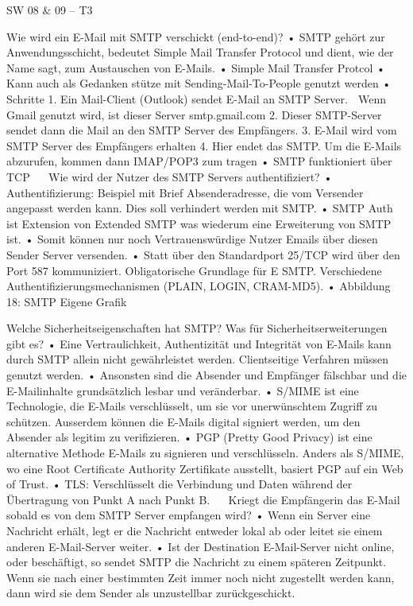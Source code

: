 \begin{itemize}
SW 08 & 09 – T3

Wie wird ein E-Mail mit SMTP verschickt (end-to-end)?
•	SMTP gehört zur Anwendungsschicht, bedeutet Simple Mail Transfer Protocol und dient, wie der Name sagt, zum Austauschen von E-Mails. 
•	Simple Mail Transfer Protcol
•	Kann auch als Gedanken stütze mit Sending-Mail-To-People genutzt werden
•	Schritte
1.	Ein Mail-Client (Outlook) sendet E-Mail an SMTP Server.
	Wenn Gmail genutzt wird, ist dieser Server smtp.gmail.com
2.	Dieser SMTP-Server sendet dann die Mail an den SMTP Server des Empfängers. 
3.	E-Mail wird vom SMTP Server des Empfängers erhalten
4.	Hier endet das SMTP. Um die E-Mails abzurufen, kommen dann IMAP/POP3 zum tragen 
•	SMTP funktioniert über TCP
 
Wie wird der Nutzer des SMTP Servers authentifiziert?
•	Authentifizierung: Beispiel mit Brief Absenderadresse, die vom Versender angepasst werden kann. Dies soll verhindert werden mit SMTP. 
•	SMTP Auth ist Extension von Extended SMTP was wiederum eine Erweiterung von SMTP ist.
•	Somit können nur noch Vertrauenswürdige Nutzer Emails über diesen Sender Server versenden. 
•	Statt über den Standardport 25/TCP wird über den Port 587 kommuniziert. Obligatorische Grundlage für E SMTP. Verschiedene Authentifizierungsmechanismen (PLAIN, LOGIN, CRAM-MD5).
•	 
Abbildung 18: SMTP Eigene Grafik


Welche Sicherheitseigenschaften hat SMTP? Was für Sicherheitserweiterungen gibt es?
•	Eine Vertraulichkeit, Authentizität und Integrität von E-Mails kann durch SMTP allein nicht gewährleistet werden. Clientseitige Verfahren müssen genutzt werden. 
•	Ansonsten sind die Absender und Empfänger fälschbar und die E-Mailinhalte grundsätzlich lesbar und veränderbar. 
•	S/MIME ist eine Technologie, die E-Mails verschlüsselt, um sie vor unerwünschtem Zugriff zu schützen. Ausserdem können die E-Mails digital signiert werden, um den Absender als legitim zu verifizieren. 
•	PGP (Pretty Good Privacy) ist eine alternative Methode E-Mails zu signieren und verschlüsseln. Anders als S/MIME, wo eine Root Certificate Authority Zertifikate ausstellt, basiert PGP auf ein Web of Trust. 
•	TLS: Verschlüsselt die Verbindung und Daten während der Übertragung von Punkt A nach Punkt B.
 
Kriegt die Empfängerin das E-Mail sobald es von dem SMTP Server empfangen wird?
•	Wenn ein Server eine Nachricht erhält, legt er die Nachricht entweder lokal ab oder leitet sie einem anderen E-Mail-Server weiter. 
•	Ist der Destination E-Mail-Server nicht online, oder beschäftigt, so sendet SMTP die Nachricht zu einem späteren Zeitpunkt. Wenn sie nach einer bestimmten Zeit immer noch nicht zugestellt werden kann, dann wird sie dem Sender als unzustellbar zurückgeschickt. 



\end{itemize}
